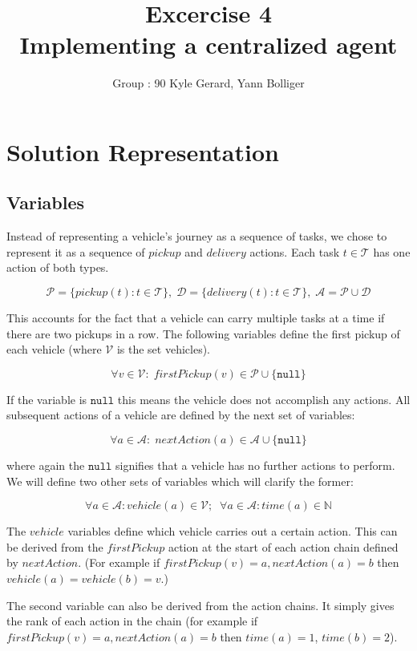 \documentclass[11pt]{article}
\title{\bf Excercise 4\\ Implementing a centralized agent}
\author{Group \textnumero : 90  Kyle Gerard, Yann Bolliger}
\begin{document}
\maketitle

\section{Solution Representation}

\subsection{Variables} 

Instead of representing a vehicle's journey as a sequence of tasks, we chose to
represent it as a sequence of $pickup$ and $delivery$ actions. Each task 
$t \in \mathcal{T}$
has one action of both types.

$$
\mathcal{P} = \{pickup(t) : t \in \mathcal{T}\} , \;  
\mathcal{D} = \{delivery(t) : t \in \mathcal{T}\} , \; 
\mathcal{A} =  \mathcal{P} \cup \mathcal{D}
$$

This accounts for the fact that a vehicle can carry multiple tasks at a time if
there are two pickups in a row. The following variables define the 
first pickup of each vehicle (where $\mathcal{V}$ is the set vehicles). 

$$
\forall v \in \mathcal{V}  : \;
firstPickup(v)  \in \mathcal{P} \cup \{\mathtt{null}\} 
$$

If the variable is $\mathtt{null}$ this means the vehicle does not accomplish
any actions. All subsequent actions of a vehicle are defined by the next set of
variables:

$$
\forall a \in \mathcal{A}  : \;
nextAction(a) \in \mathcal{A}  \cup \{\mathtt{null}\} 
$$

where again the $\mathtt{null}$ signifies that a vehicle has no further actions
to perform. We will define two other sets of variables which will clarify the
former:

$$
\forall a \in \mathcal{A}  :
vehicle(a) \in \mathcal{V};
\;\;
\forall a \in \mathcal{A}  :
time(a) \in \mathbb{N}
$$

The $vehicle$ variables define which vehicle carries out a certain action.
This can be derived from the $firstPickup$ action at the start of
each action chain defined by $nextAction$. (For example if
$firstPickup(v) = a, nextAction(a) = b$ then 
$vehicle(a) = vehicle(b) = v$.)

The second variable can also be 
derived from the action chains. It simply gives the rank of each action
in the chain (for example if 
$firstPickup(v) = a, nextAction(a) = b$ then $time(a) = 1$, $time(b) = 2$).
\end{document}
